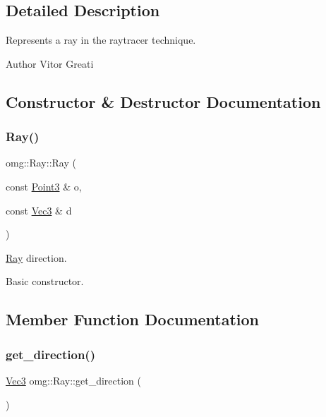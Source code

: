 \subsection{Detailed Description}
Represents a ray in the raytracer technique. 

\begin{DoxyAuthor}{Author}
Vitor Greati 
\end{DoxyAuthor}


\subsection{Constructor \& Destructor Documentation}
\mbox{\label{classomg_1_1_ray_a7418b3be2225de5510c63781ee5ad3f1}} 
\subsubsection{\texorpdfstring{Ray()}{Ray()}}
{\footnotesize\ttfamily omg\+::\+Ray\+::\+Ray (\begin{DoxyParamCaption}\item[{const \mbox{\hyperlink{namespaceomg_af3df7d66f0c70fe64649fcbe00edba5e}{Point3}} \&}]{o,  }\item[{const \mbox{\hyperlink{namespaceomg_acf927839a305877d454c507f0b96730b}{Vec3}} \&}]{d }\end{DoxyParamCaption})\hspace{0.3cm}{\ttfamily [inline]}}



\mbox{\hyperlink{classomg_1_1_ray}{Ray}} direction. 

Basic constructor. 

\subsection{Member Function Documentation}
\mbox{\label{classomg_1_1_ray_af78835511d6eb2d50fafdacb69e82b8c}} 
\subsubsection{\texorpdfstring{get\_direction()}{get\_direction()}}
{\footnotesize\ttfamily \mbox{\hyperlink{namespaceomg_acf927839a305877d454c507f0b96730b}{Vec3}} omg\+::\+Ray\+::get\+\_\+direction (\begin{DoxyParamCaption}{ }\end{DoxyParamCaption})\hspace{0.3cm}{\ttfamily [inline]}}



